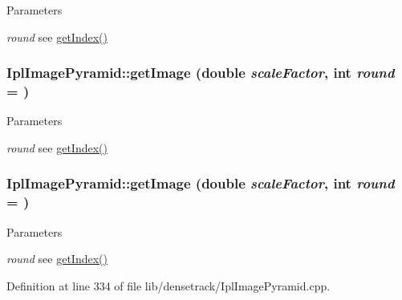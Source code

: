 \begin{DoxyParams}{Parameters}
\item[{\em round}]see \hyperlink{class_ipl_image_pyramid_a079949237facf732d588900b143ed3d6}{getIndex()} \end{DoxyParams}
\hypertarget{class_ipl_image_pyramid_a73af0a82dfdca6eaa25a75b3c73996a3}{
\subsubsection[{getImage}]{ IplImagePyramid::getImage (double {\em scaleFactor}, \/  int {\em round} = {})}}
\label{class_ipl_image_pyramid_a73af0a82dfdca6eaa25a75b3c73996a3}

\begin{DoxyParams}{Parameters}
\item[{\em round}]see \hyperlink{class_ipl_image_pyramid_a079949237facf732d588900b143ed3d6}{getIndex()} \end{DoxyParams}
\hypertarget{class_ipl_image_pyramid_a73af0a82dfdca6eaa25a75b3c73996a3}{
\subsubsection[{getImage}]{ IplImagePyramid::getImage (double {\em scaleFactor}, \/  int {\em round} = {})}}
\label{class_ipl_image_pyramid_a73af0a82dfdca6eaa25a75b3c73996a3}

\begin{DoxyParams}{Parameters}
\item[{\em round}]see \hyperlink{class_ipl_image_pyramid_a079949237facf732d588900b143ed3d6}{getIndex()} \end{DoxyParams}


Definition at line 334 of file lib/densetrack/IplImagePyramid.cpp.

